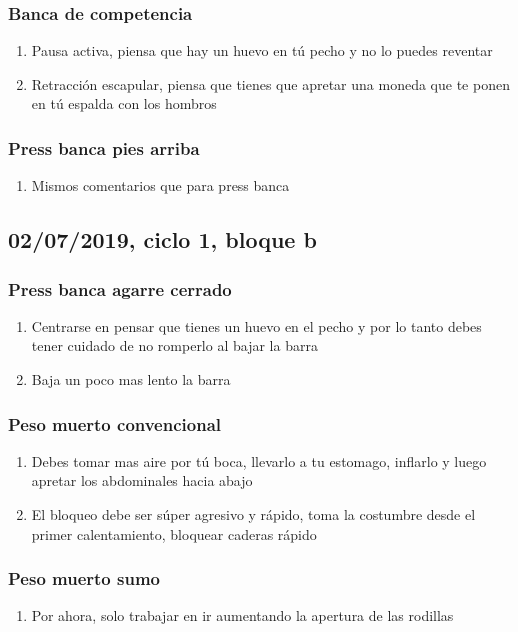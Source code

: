 \documentclass[11pt]{article}
\begin{document}
\subsubsection{Banca de competencia}
\label{sec:org37c5998}
\begin{enumerate}
\item Pausa activa, piensa que hay un huevo en tú pecho y no lo puedes
reventar
\item Retracción escapular, piensa que tienes que apretar una moneda que
te ponen en tú espalda con los hombros
\end{enumerate}
\subsubsection{Press banca pies arriba}
\label{sec:orgeec8e55}
\begin{enumerate}
\item Mismos comentarios que para press banca
\end{enumerate}
\subsection{02/07/2019, ciclo 1, bloque b}
\label{sec:org88cd223}
\subsubsection{Press banca agarre cerrado}
\label{sec:orgf54a5c7}
\begin{enumerate}
\item Centrarse en pensar que tienes un huevo en el pecho y por lo tanto
debes tener cuidado de no romperlo al bajar la barra
\item Baja un poco mas lento la barra
\end{enumerate}
\subsubsection{Peso muerto convencional}
\label{sec:org89f1a9a}
\begin{enumerate}
\item Debes tomar mas aire por tú boca, llevarlo a tu estomago, inflarlo
y luego apretar los abdominales hacia abajo
\item El bloqueo debe ser súper agresivo y rápido, toma la costumbre
desde el primer calentamiento, bloquear caderas rápido
\end{enumerate}
\subsubsection{Peso muerto sumo}
\label{sec:org88b2dcb}
\begin{enumerate}
\item Por ahora, solo trabajar en ir aumentando la apertura de las rodillas
\end{enumerate}
\end{document}
